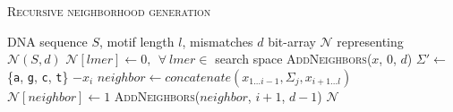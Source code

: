 \documentclass[oneside,12pt]{DISCSthesis}
\begin{document}
{		{
			\noindent \hspace*{6pt}{\bf Algorithm 2.3} \textsc{Recursive neighborhood generation}\small
			\begin{algorithmic}[1]
				\label{alg:recursive-nbr-gen}
				\Require DNA sequence $S$, motif length $l$, mismatches $d$
				\Ensure bit-array $\mathcal{N}$ representing $\mathcal{N}(S,d)$ \vspace*{6pt}
				\State $\mathcal{N}[lmer] \leftarrow 0,\ \ \forall\ lmer \in $ search space 
				\State \textsc{AddNeighbors}($x$, 0, $d$) \hspace*{79pt}
				\EndFor
				\newline
				\State {}
						\State $\Sigma' \leftarrow$ \{\texttt{a}, \texttt{g}, \texttt{c}, \texttt{t}\} $- x_{i}$ \hspace*{79pt}
							\State $neighbor \leftarrow concatenate(x_{1...i-1},\Sigma_{j},x_{i+1...l})$
							\State $\mathcal{N}[neighbor] \leftarrow 1$
								\State \textsc{AddNeighbors}($neighbor$, $i+1$, $d-1$)
							\EndIf
						\EndFor
					\EndFor
				\EndProcedure
				\State\Return $\mathcal{N}$
				\end{algorithmic}
			}

			


}
\end{document}
